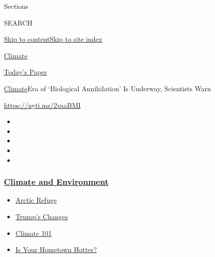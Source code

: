 Sections

SEARCH

\protect\hyperlink{site-content}{Skip to
content}\protect\hyperlink{site-index}{Skip to site index}

\href{https://www.nytimes3xbfgragh.onion/section/climate}{Climate}

\href{https://myaccount.nytimes3xbfgragh.onion/auth/login?response_type=cookie\&client_id=vi}{}

\href{https://www.nytimes3xbfgragh.onion/section/todayspaper}{Today's
Paper}

\href{/section/climate}{Climate}\textbar{}Era of `Biological
Annihilation' Is Underway, Scientists Warn

\url{https://nyti.ms/2vaaBMI}

\begin{itemize}
\item
\item
\item
\item
\item
\end{itemize}

\hypertarget{climate-and-environment}{%
\subsubsection{\texorpdfstring{\href{https://www.nytimes3xbfgragh.onion/section/climate?name=styln-climate\&region=TOP_BANNER\&variant=undefined\&block=storyline_menu_recirc\&action=click\&pgtype=Article\&impression_id=52ca3100-e39b-11ea-84b4-99a32c8d6878}{Climate
and
Environment}}{Climate and Environment}}\label{climate-and-environment}}

\begin{itemize}
\tightlist
\item
  \href{https://www.nytimes3xbfgragh.onion/2020/08/17/climate/alaska-oil-drilling-anwr.html?name=styln-climate\&region=TOP_BANNER\&variant=undefined\&block=storyline_menu_recirc\&action=click\&pgtype=Article\&impression_id=52ca3101-e39b-11ea-84b4-99a32c8d6878}{Arctic
  Refuge}
\item
  \href{https://www.nytimes3xbfgragh.onion/interactive/2020/climate/trump-environment-rollbacks.html?name=styln-climate\&region=TOP_BANNER\&variant=undefined\&block=storyline_menu_recirc\&action=click\&pgtype=Article\&impression_id=52ca3102-e39b-11ea-84b4-99a32c8d6878}{Trump's
  Changes}
\item
  \href{https://www.nytimes3xbfgragh.onion/interactive/2020/04/19/climate/climate-crash-course-1.html?name=styln-climate\&region=TOP_BANNER\&variant=undefined\&block=storyline_menu_recirc\&action=click\&pgtype=Article\&impression_id=52ca3103-e39b-11ea-84b4-99a32c8d6878}{Climate
  101}
\item
  \href{https://www.nytimes3xbfgragh.onion/interactive/2018/08/30/climate/how-much-hotter-is-your-hometown.html?name=styln-climate\&region=TOP_BANNER\&variant=undefined\&block=storyline_menu_recirc\&action=click\&pgtype=Article\&impression_id=52ca5810-e39b-11ea-84b4-99a32c8d6878}{Is
  Your Hometown Hotter?}
\end{itemize}


